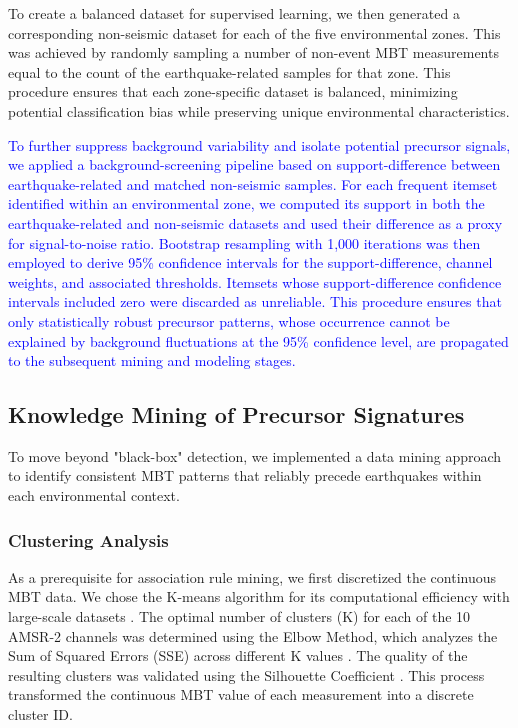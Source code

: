 \documentclass[preprint,review,12pt,authoryear]{elsarticle}
\providecommand{\DIFaddtex}[1]{{\sf #1}} %
\providecommand{\DIFaddbegin}{} %
\providecommand{\DIFaddend}{} %
\providecommand{\DIFadd}[1]{\texorpdfstring{\DIFaddtex{#1}}{#1}} %
\newcommand{\DIFaddincludegraphics}[2][]{{\color{blue}\fbox{\DIFOincludegraphics[#1]{#2}}}} %
\DeclareRobustCommand{\DIFaddbegin}{\DIFOaddbegin \let\includegraphics\DIFaddincludegraphics} %
\DeclareRobustCommand{\DIFaddend}{\DIFOaddend \let\includegraphics\DIFOincludegraphics} %
\renewcommand{\DIFaddtex}[1]{\textcolor{blue}{#1}}
\begin{document}
To create a balanced dataset for supervised learning, we then generated a corresponding non-seismic dataset for each of the five environmental zones. This was achieved by randomly sampling a number of non-event MBT measurements equal to the count of the earthquake-related samples for that zone. This procedure ensures that each zone-specific dataset is balanced, minimizing potential classification bias while preserving unique environmental characteristics.

\DIFaddbegin \DIFadd{To further suppress background variability and isolate potential precursor signals, we applied a background-screening pipeline based on support-difference between earthquake-related and matched non-seismic samples. For each frequent itemset identified within an environmental zone, we computed its support in both the earthquake-related and non-seismic datasets and used their difference as a proxy for signal-to-noise ratio. Bootstrap resampling with 1,000 iterations was then employed to derive 95\% confidence intervals for the support-difference, channel weights, and associated thresholds. Itemsets whose support-difference confidence intervals included zero were discarded as unreliable. This procedure ensures that only statistically robust precursor patterns, whose occurrence cannot be explained by background fluctuations at the 95\% confidence level, are propagated to the subsequent mining and modeling stages.
}

\DIFaddend \subsection{Knowledge Mining of Precursor Signatures}\label{sec:knowledge_mining}
To move beyond "black-box" detection, we implemented a data mining approach to identify consistent MBT patterns that reliably precede earthquakes within each environmental context.

\subsubsection{Clustering Analysis}\label{sec:clustering}
As a prerequisite for association rule mining, we first discretized the continuous MBT data. We chose the K-means algorithm for its computational efficiency with large-scale datasets \citep{hanConceptsTechniques2006}. The optimal number of clusters (K) for each of the 10 AMSR-2 channels was determined using the Elbow Method, which analyzes the Sum of Squared Errors (SSE) across different K values \citep{thorndikeWhoBelongsFamily1953}. The quality of the resulting clusters was validated using the Silhouette Coefficient \citep{rousseeuwSilhouettesGraphicalAid1987}. This process transformed the continuous MBT value of each measurement into a discrete cluster ID.
\end{document}
